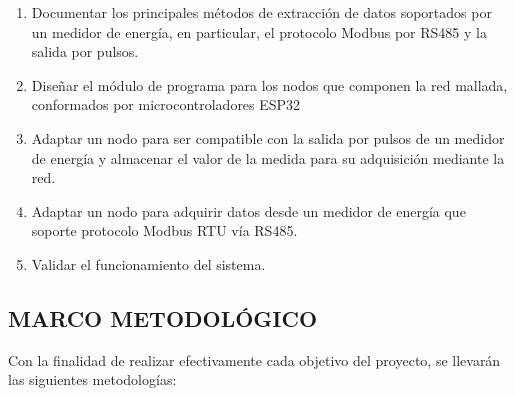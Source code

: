 \documentclass[12pt,letterpaper]{article}
\begin{document}
\begin{enumerate}[1.]
	
	
	 \item Documentar los principales métodos de extracción de datos soportados por un medidor de energía, en particular, el protocolo Modbus por RS485 y la salida por pulsos.
	
	 \item Diseñar el módulo de programa para los nodos que componen la red mallada, conformados por microcontroladores ESP32
	
	 \item Adaptar un nodo para ser compatible con la salida por pulsos de un medidor de energía y almacenar el valor de la medida para su adquisición mediante la red.
	
	 \item Adaptar un nodo para adquirir datos desde un medidor de energía que soporte protocolo Modbus RTU vía RS485.
	
	 \item Validar el funcionamiento del sistema.
 	
\end{enumerate}
\newpage



\begin{center}
	
	\section*{ MARCO METODOLÓGICO}
	
\end{center}

\vspace{1cm}

Con la finalidad de realizar efectivamente cada objetivo del proyecto, se llevarán las siguientes metodologías:
\bigskip
\end{document}
